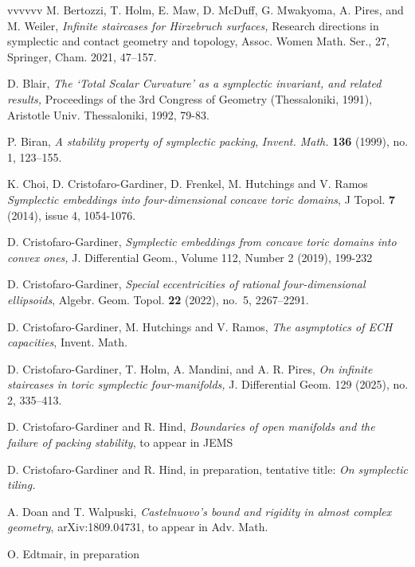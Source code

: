 \documentclass[11pt, reqno]{amsart}
\theoremstyle{remark}
\numberwithin{equation}{subsection}
\numberwithin{figure}{section}
\theoremstyle{customremark}
\begin{document}
\begin{thebibliography}{vvvvvv}
 M. Bertozzi, T. Holm, E. Maw, D. McDuff, G. Mwakyoma, A. Pires, and M. Weiler,
{\it Infinite staircases for Hirzebruch surfaces,} Research directions in symplectic and contact geometry and topology, 
Assoc. Women Math. Ser., 27, Springer, Cham. 2021, 47--157.

  D. Blair, {\em The ‘Total Scalar Curvature’ as a symplectic invariant, and related results,}
Proceedings of the 3rd Congress of Geometry (Thessaloniki, 1991), Aristotle Univ.
Thessaloniki, 1992, 79-83.
 
 P. Biran, {\em A stability property of symplectic packing}, {\it Invent. Math.} {\bf 136} (1999), no. 1, 123–155.

 K. Choi, D. Cristofaro-Gardiner, D. Frenkel, M. Hutchings and V. Ramos {\it Symplectic embeddings into four-dimensional concave toric domains}, J Topol. {\bf 7} (2014), issue 4, 1054-1076.

 D. Cristofaro-Gardiner, {\it Symplectic embeddings from concave toric domains into convex ones,}
 J. Differential Geom., Volume 112, Number 2 (2019), 199-232


 D. Cristofaro-Gardiner,
{\it Special eccentricities of rational four-dimensional ellipsoids},
Algebr. Geom. Topol. \textbf{22} (2022), no.~5, 2267--2291.

 D. Cristofaro-Gardiner, M. Hutchings and V. Ramos, {\em The asymptotics of ECH capacities}, Invent. Math. 

D. Cristofaro-Gardiner, T. Holm, A. Mandini, and A. R. Pires, {\it  On infinite staircases in toric symplectic four-manifolds, }
J. Differential Geom. 129 (2025), no. 2, 335–413.

 D. Cristofaro-Gardiner and R. Hind, {\em Boundaries of open manifolds and the failure of packing stability}, to appear in JEMS

 D. Cristofaro-Gardiner and R. Hind, in preparation, tentative title: {\em On symplectic tiling.}



 A. Doan and T. Walpuski, {\em Castelnuovo’s bound and rigidity in almost complex geometry}, arXiv:1809.04731, to appear in Adv. Math.

 O. Edtmair, in preparation


\end{thebibliography}
\end{document}
